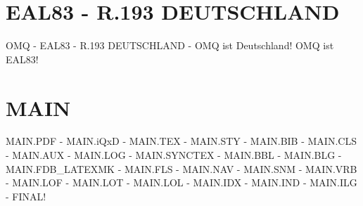 \documentclass{MAIN}
\begin{document}
\maketitle
\section*{EAL83 - R.193 DEUTSCHLAND}
OMQ - EAL83 - R.193 DEUTSCHLAND - OMQ ist Deutschland! OMQ ist EAL83!
\section*{MAIN}
MAIN.PDF - MAIN.iQxD - MAIN.TEX - MAIN.STY - MAIN.BIB - MAIN.CLS - MAIN.AUX - MAIN.LOG - MAIN.SYNCTEX - MAIN.BBL - MAIN.BLG - MAIN.FDB_LATEXMK - MAIN.FLS - MAIN.NAV - MAIN.SNM - MAIN.VRB - MAIN.LOF - MAIN.LOT - MAIN.LOL - MAIN.IDX - MAIN.IND - MAIN.ILG - FINAL!
\cite{omq_eal83}

\printindex
\end{document}
